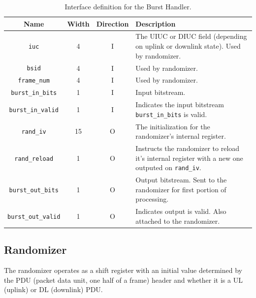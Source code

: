 \documentclass[dvips,10pt,twocolumn]{article}
\begin{document}
\begin{table} \begin{tabularx}{\textwidth}{c|c|c|X}
	\label{tbl:burst-io}
	Name & Width & Direction & Description \\ \hline

	\texttt{iuc} & 4 & I & The UIUC or DIUC field (depending on uplink
	or downlink state). Used by randomizer. \\
	
	\texttt{bsid} & 4 & I & Used by randomizer. \\
	
	\texttt{frame\_num} & 4 & I & Used by randomizer. \\

	\texttt{burst\_in\_bits} & 1 & I & Input bitstream. \\

	\texttt{burst\_in\_valid} & 1 &  I & Indicates the input bitstream
	\texttt{burst\_in\_bits} is valid. \\

	\texttt{rand\_iv} & 15 & O & The initialization for
	the randomizer's internal register. \\

	\texttt{rand\_reload} & 1 & O & Instructs the randomizer to reload
	it's internal register with a new one outputed on
	\texttt{rand\_iv}. \\

	\texttt{burst\_out\_bits} & 1 & O & Output bitstream. Sent to the
	randomizer for first portion of processing. \\
	\texttt{burst\_out\_valid} & 1 & O & Indicates output is valid.
	Also attached to the randomizer. \\
\end{tabularx}
\caption{Interface definition for the Burst Handler.}
\end{table}

	\subsection{Randomizer}
	\label{sec:rand}
	The randomizer operates as a shift register with an initial value
	determined by the PDU (packet data unit, one half of a frame) header
	and whether it is a UL (uplink) or DL (downlink) PDU.
\end{document}
